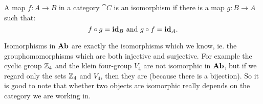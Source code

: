 \begin{definition}
	A map $f: A \to B$ in a category $\cat{C}$ is an isomorphism if there is a map $g: B \to A$ such that:
	$$ f \circ g = \mathbf{id}_B \text{ and } g \circ f = \mathbf{id}_A.$$
\end{definition}

Isomorphisms in $\mathbf{Ab}$ are exactly the isomorphisms which we know, ie. the grouphomomorphisms which are both injective and surjective.
For example the cyclic group $\mathbb{Z}_4$ and the klein four-group $V_4$ are not isomorphic in $\mathbf{Ab}$, but if we regard only the sets $\mathbb{Z}_4$ and $V_4$, then they are (because there is a bijection). So it is good to note that whether two objects are isomorphic  really depends on the category we are working in.

